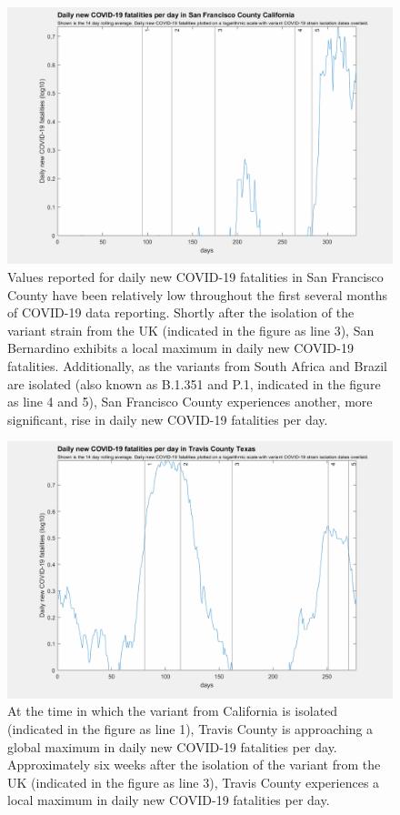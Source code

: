 \documentclass[]{article}
\begin{document}
\begin{figure}[!h]
	\includegraphics[width=\linewidth]{images/san_francisco_fatalities_strains_log.png}
	\caption{Values reported for daily new COVID-19 fatalities in San Francisco County have been relatively low throughout the first several months of COVID-19 data reporting. Shortly after the isolation of the variant strain from the UK (indicated in the figure as line 3), San Bernardino exhibits a local maximum in daily new COVID-19 fatalities. Additionally, as the variants from South Africa and Brazil are isolated (also known as B.1.351 and P.1, indicated in the figure as line 4 and 5), San Francisco County experiences another, more significant, rise in daily new COVID-19 fatalities per day.}
	\label{fig:images/san_francisco_fatalities_strains_logLabel}
\end{figure}


\begin{figure}[!h]
	\includegraphics[width=\linewidth]{images/travis_fatalities_strains_log.png}
	\caption{At the time in which the variant from California is isolated (indicated in the figure as line 1), Travis County is approaching a global maximum in daily new COVID-19 fatalities per day. Approximately six weeks after the isolation of the variant from the UK (indicated in the figure as line 3), Travis County experiences a local maximum in daily new COVID-19 fatalities per day. }
	\label{fig:images/travis_fatalities_strains_logLabel}
\end{figure}
\end{document}
